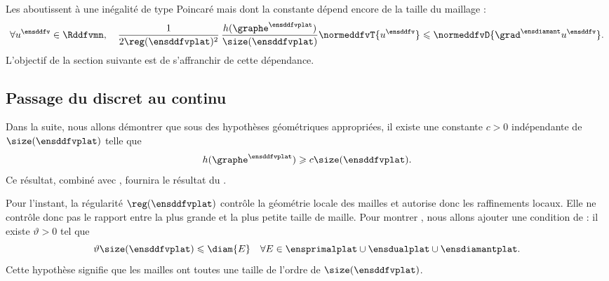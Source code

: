 \noindent Les  aboutissent à une inégalité de type Poincaré mais dont la constante dépend encore de la taille du maillage :
\begin{equation} \label{eq:inegalite_poincare_inter}
\forall u^\ensddfv \in \Rddfvmn, 
\quad
\frac{1}{2 \reg(\ensddfvplat)^2} \, \frac{h(\graphe^\ensddfvplat)}{\size(\ensddfvplat)} \normeddfvT{u^\ensddfv} \leqslant \normeddfvD{\grad^\ensdiamant u^\ensddfv}.
\end{equation}
L'objectif de la section suivante est de s'affranchir de cette dépendance. 

\subsection{Passage du discret au continu}

Dans la suite, nous allons démontrer que sous des hypothèses géométriques appropriées, il existe une constante $c > 0$ indépendante de $\size(\ensddfvplat)$ telle que
\begin{equation} \label{eq:objectif}
h(\graphe^\ensddfvplat) \geqslant c \size(\ensddfvplat).
\end{equation}
Ce résultat, combiné avec , fournira le résultat du .

Pour l'instant, la régularité $\reg(\ensddfvplat)$ contrôle la géométrie locale des mailles et autorise donc les raffinements locaux. Elle ne contrôle donc pas le rapport entre la plus grande et la plus petite taille de maille. Pour montrer , nous allons ajouter une condition de  : il existe $\vartheta > 0$ tel que
\begin{equation} \label{eq:quasi_uniformite}
\vartheta \size(\ensddfvplat) \leqslant \diam{E} \quad \forall E \in \ensprimalplat \cup \ensdualplat \cup \ensdiamantplat.
\end{equation}
Cette hypothèse signifie que les mailles ont toutes une taille de l'ordre de $\size(\ensddfvplat)$. \\

